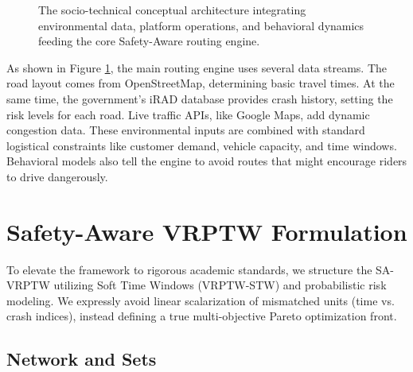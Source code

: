 \documentclass[10pt,twocolumn,letterpaper]{article}
\begin{document}
\begin{figure}[ht]
\caption{The socio-technical conceptual architecture integrating environmental data, platform operations, and behavioral dynamics feeding the core Safety-Aware routing engine.}
\label{fig:architecture}
\end{figure}

As shown in Figure \ref{fig:architecture}, the main routing engine uses several data streams. The road layout comes from OpenStreetMap, determining basic travel times. At the same time, the government's iRAD database provides crash history, setting the risk levels for each road. Live traffic APIs, like Google Maps, add dynamic congestion data. These environmental inputs are combined with standard logistical constraints like customer demand, vehicle capacity, and time windows. Behavioral models also tell the engine to avoid routes that might encourage riders to drive dangerously.

\section{Safety-Aware VRPTW Formulation}

To elevate the framework to rigorous academic standards, we structure the SA-VRPTW utilizing Soft Time Windows (VRPTW-STW) and probabilistic risk modeling. We expressly avoid linear scalarization of mismatched units (time vs. crash indices), instead defining a true multi-objective Pareto optimization front.

\subsection{Network and Sets}
\end{document}
